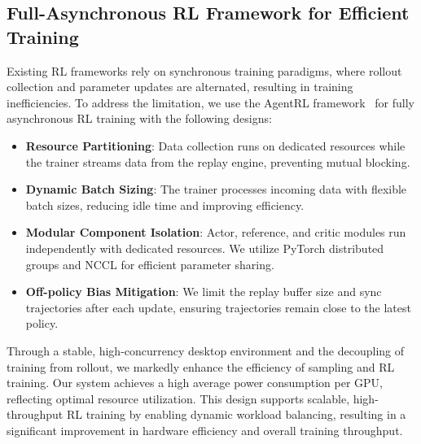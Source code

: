 \subsection{Full-Asynchronous RL Framework for Efficient Training}\label{sec:full-asynchronous}
Existing RL frameworks rely on synchronous training paradigms, where rollout collection and parameter updates are alternated, resulting in training inefficiencies. To address the limitation, we use the AgentRL framework~\citep{zhang2025model} for fully asynchronous RL training with the following designs:

\begin{itemize}[leftmargin=1.5em,itemsep=0pt,parsep=0.2em,topsep=0.0em,partopsep=0.0em]
    \item \textbf{Resource Partitioning}: Data collection runs on dedicated resources while the trainer streams data from the replay engine, preventing mutual blocking.
    \item \textbf{Dynamic Batch Sizing}: The trainer processes incoming data with flexible batch sizes, reducing idle time and improving efficiency.
    \item \textbf{Modular Component Isolation}: Actor, reference, and critic modules run independently with dedicated resources. We utilize PyTorch distributed groups and NCCL for efficient parameter sharing.
    \item \textbf{Off-policy Bias Mitigation}: We limit the replay buffer size and sync trajectories after each update, ensuring trajectories remain close to the latest policy.
\end{itemize}

Through a stable, high-concurrency desktop environment and the decoupling of training from rollout, we markedly enhance the efficiency of sampling and RL training. Our system achieves a high average power consumption per GPU, reflecting optimal resource utilization. This design supports scalable, high-throughput RL training by enabling dynamic workload balancing, resulting in a significant improvement in hardware efficiency and overall training throughput.